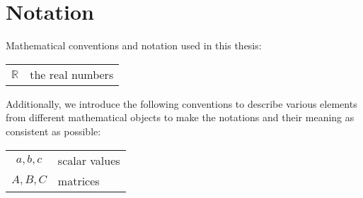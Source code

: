 \section*{Notation}
Mathematical conventions and notation used in this thesis:

\begin{center}
    \renewcommand{\arraystretch}{1.5}
    \begin{tabular}{ c l }
        
        $\mathbb{R}$ & the real numbers
    \end{tabular}
\end{center}

Additionally, we introduce the following conventions to describe various elements from different mathematical objects to make the notations and their meaning as consistent as possible:

\begin{center}
    \renewcommand{\arraystretch}{1.5}
    \begin{tabular}{c l}
        $a, b, c$ & scalar values \\
        $A, B, C$ & matrices


    \end{tabular}
\end{center}
